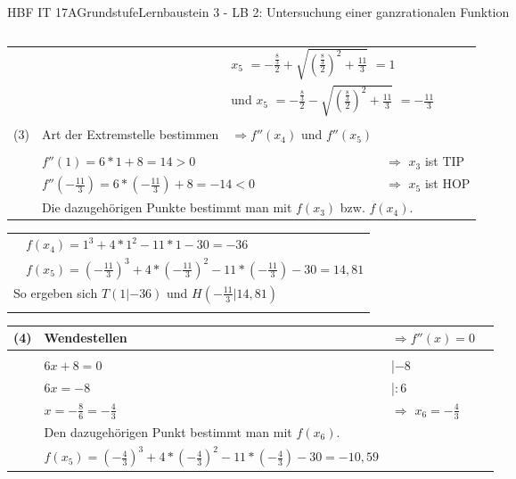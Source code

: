 \documentclass[oneside,openany,headings=optiontotoc,11pt,numbers=noenddot]{scrreprt}
\begin{document}
\begin{worksheet}{HBF IT 17A}{Grundstufe}{Lernbaustein 3 - LB 2: Untersuchung einer ganzrationalen Funktion}
\begin{framed}
\begin{tabularx}{\textwidth}{lXXl}
			\end{tabularx}
			\begin{tabularx}{\textwidth}{lXXl}
				& & \multicolumn{2}{l}{\colorbox{green!10}{\(x_5\)} \(= -\frac{\frac{8}{3}}{2} + \sqrt{\left(\frac{\frac{8}{3}}{2}\right)^2 +\frac{11}{3}}\) \colorbox{green!10}{\(= 1\)}}\\
				& & \multicolumn{2}{l}{und \colorbox{green!10}{\(x_5\)} \(= -\frac{\frac{8}{3}}{2} - \sqrt{\left(\frac{\frac{8}{3}}{2}\right)^2 +\frac{11}{3}}\) \colorbox{green!10}{\(= -\frac{11}{3}\)}}\\
				\\
				(3) & Art der Extremstelle bestimmen & \(\Rightarrow f''(x_4)\) und \(f''(x_5)\)\\
				\hline\\				 
				& \multicolumn{2}{l}{\(f''(1) =  6*1 +8 = 14 > 0\)} & \(\Rightarrow\) \colorbox{green!10}{\(x_3\) ist TIP}\\
				& \multicolumn{2}{l}{\(f''(-\frac{11}{3}) = 6*(-\frac{11}{3}) + 8 = -14 < 0\)} & \(\Rightarrow\) \colorbox{green!10}{\(x_5\) ist HOP}\\
				& \multicolumn{3}{l}{Die dazugehörigen Punkte bestimmt man mit \(f(x_3)\) bzw. \(f(x_4)\).}\\
			\end{tabularx}
			\begin{tabularx}{\textwidth}{ll}
				& \(f(x_4) = 1^3 +4*1^2-11*1-30 = -36\)\\
				& \(f(x_5) = (-\frac{11}{3})^3 +4*(-\frac{11}{3})^2-11*(-\frac{11}{3})-30 = 14,81\)\\
				\multicolumn{2}{l}{So ergeben sich \colorbox{blue!5}{\(T(1|-36)\)} und \colorbox{blue!5}{\(H(-\frac{11}{3}|14,81)\)}}\\
				\hline\hline\\
			\end{tabularx}
			\begin{tabularx}{\textwidth}{lXXl}
				(4) & Wendestellen & \(\Rightarrow f''(x) = 0\)\\
				\hline\\
				& \(6x +8 = 0\) & |\(-8\)\\
				& \(6x = -8\) & |\(:6\)\\
				& \(x = -\frac{8}{6} = -\frac{4}{3}\) & \(\Rightarrow\) \colorbox{green!10}{\(x_6 = -\frac{4}{3}\)}\\
				& Den dazugehörigen Punkt bestimmt man mit \(f(x_6)\).\\
				& \(f(x_5) = (-\frac{4}{3})^3 +4*(-\frac{4}{3})^2-11*(-\frac{4}{3})-30 = -10,59\)\\

\end{tabularx}
\end{framed}
\end{worksheet}
\end{document}
